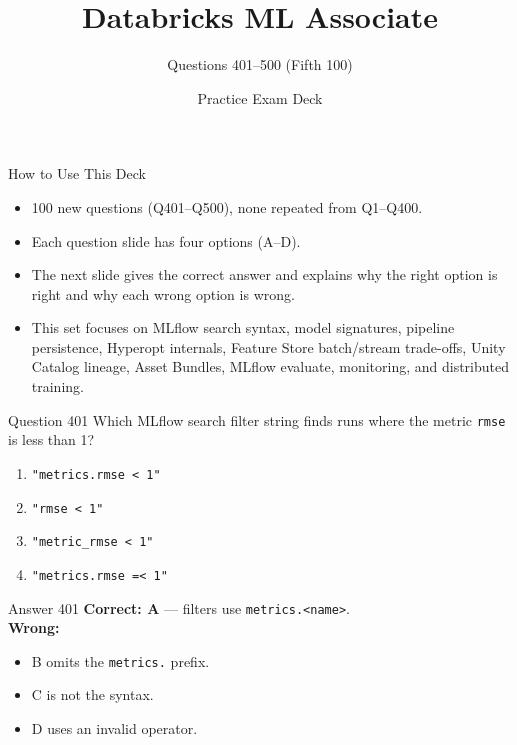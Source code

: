 \documentclass[aspectratio=169,11pt]{beamer}
\title{Databricks ML Associate}
\subtitle{Questions 401--500 (Fifth 100)}
\author{Practice Exam Deck}
\date{}
\begin{document}
	
	\begin{frame}
		\titlepage
	\end{frame}
	
	\begin{frame}{How to Use This Deck}
		\begin{itemize}
			\item 100 new questions (Q401--Q500), none repeated from Q1--Q400.
			\item Each question slide has four options (A--D).
			\item The next slide gives the correct answer and explains why the right option is right and why each wrong option is wrong.
			\item This set focuses on MLflow search syntax, model signatures, pipeline persistence, Hyperopt internals, Feature Store batch/stream trade-offs, Unity Catalog lineage, Asset Bundles, MLflow evaluate, monitoring, and distributed training.
		\end{itemize}
	\end{frame}
	
	\begin{frame}{Question 401}
		Which MLflow search filter string finds runs where the metric \texttt{rmse} is less than 1?
		\begin{enumerate}[label=\Alph*.]
			\item \texttt{"metrics.rmse < 1"}
			\item \texttt{"rmse < 1"}
			\item \texttt{"metric\_rmse < 1"}
			\item \texttt{"metrics.rmse =< 1"}
		\end{enumerate}
	\end{frame}
	\begin{frame}{Answer 401}
		\textbf{Correct: A} --- filters use \texttt{metrics.<name>}.\\
		\vspace{0.5em}
		\textbf{Wrong:}
		\begin{itemize}
			\item B omits the \texttt{metrics.} prefix.
			\item C is not the syntax.
			\item D uses an invalid operator.
		\end{itemize}
	\end{frame}
	
\end{document}

